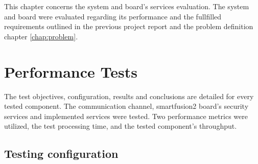 \cleardoublepage
\label{chap:evaluation}

This chapter concerns the system and board's services evaluation. The system and board were evaluated regarding its performance and the fullfilled requirements outlined in the previous project report and the problem definition chapter \ref{chap:problem}.
\section{Performance Tests}\label{chap:evaluation:performance}

The test objectives, configuration, results and conclusions are detailed for every tested component.
The communication channel, smartfusion2 board's security services and implemented services were tested.
Two performance metrics were utilized, the test processing time, and the tested component's throughput.

\subsection{Testing configuration}\label{chap:evaluation:performance:config}

